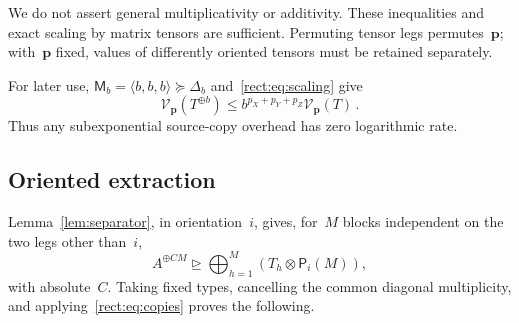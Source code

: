 \documentclass[11pt,letterpaper]{article}
\theoremstyle{definition}
\numberwithin{equation}{section}
\newcommand{\MM}{\mathsf M}
\newcommand{\degen}{\unrhd}
\newcommand{\res}{\succeq}
\begin{document}
We do not assert general multiplicativity or additivity. These inequalities and exact scaling by matrix tensors are sufficient. Permuting tensor legs permutes~$\mathbf p$; with~$\mathbf p$ fixed, values of differently oriented tensors must be retained separately.

For later use, $\MM_b=\langle b,b,b\rangle\res\Delta_b$ and~\eqref{rect:eq:scaling} give
\begin{equation}\label{rect:eq:copies}
 \mathcal V_{\mathbf p}(T^{\oplus b})
 \leq b^{p_X+p_Y+p_Z}\mathcal V_{\mathbf p}(T)\,.
\end{equation}
Thus any subexponential source-copy overhead has zero logarithmic rate.

\subsection{Oriented extraction}\label{sec:oriented-extraction}
Lemma~\ref{lem:separator}, in orientation~$i$, gives, for~$M$ blocks independent on the two legs other than~$i$,
\begin{equation*}
 A^{\oplus CM}\degen\bigoplus_{h=1}^M(T_h\otimes \mathsf P_i(M)),
\end{equation*}
with absolute~$C$. Taking fixed types, cancelling the common diagonal multiplicity, and applying~\eqref{rect:eq:copies} proves the following.
\end{document}
